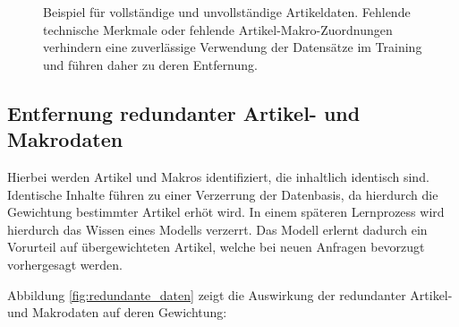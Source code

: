 \begin{figure}[H]
    \caption{Beispiel für vollständige und unvollständige Artikeldaten. Fehlende technische Merkmale oder fehlende Artikel-Makro-Zuordnungen verhindern eine zuverlässige Verwendung der Datensätze im Training und führen daher zu deren Entfernung.} 
    \label{fig:unvollstaendige_daten} 
\end{figure}

\subsection{Entfernung redundanter Artikel- und Makrodaten}

Hierbei werden Artikel und Makros identifiziert, die inhaltlich identisch sind. 
Identische Inhalte führen zu einer Verzerrung der Datenbasis, da hierdurch die Gewichtung bestimmter Artikel erhöt wird.
In einem späteren Lernprozess wird hierdurch das Wissen eines Modells verzerrt. 
Das Modell erlernt dadurch ein Vorurteil auf übergewichteten Artikel, welche bei neuen Anfragen bevorzugt vorhergesagt werden.

Abbildung \ref{fig:redundante_daten} zeigt die Auswirkung der redundanter Artikel- und Makrodaten auf deren Gewichtung:

